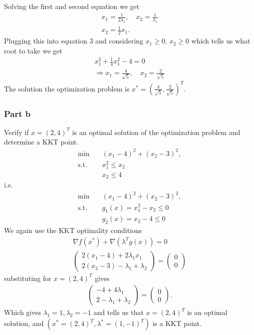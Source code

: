 Solving the first and second equation we get
\begin{align}
    x_1 = \frac{1}{2\lambda_1},\quad x_2 = \frac{1}{\lambda_1}\\
    x_2 = \frac{1}{2}x_1.
\end{align}
Plugging this into equation 3 and considering $x_1 \ge 0$, $x_2 \ge 0$
which tells us what root to take we get
\begin{align}
    x_1^{2}+\frac{1}{4}x_1^{2} -4 = 0\\
    \Rightarrow x_1 = \frac{4}{\sqrt{5}}, \quad x_2 = \frac{2}{\sqrt{5} }
\end{align}
The solution the optimization problem is $x^{*}=(\frac{4}{\sqrt{5}},
\frac{2}{\sqrt{5}})^{T}$.
\subsubsection{Part b}
Verify if $x=(2,4)^{T}$ is an optimal solution of the optimization problem
and determine a KKT point.
\begin{align}
    \text{min}\quad & (x_1-4)^{2} + (x_2-3)^{2},\\
    \text{s.t.}\quad & x_1^{2}\le x_2 \nonumber\\
    &x_2 \le 4 \nonumber
\end{align}
i.e.
\begin{align}
    \text{min}\quad & (x_1-4)^{2} + (x_2-3)^{2},\\
    \text{s.t.}\quad &g_1(x) = x_1^{2} - x_2\le 0  \nonumber\\
    &g_2(x) = x_2 -4 \le 0 \nonumber
\end{align}
We again use the KKT optimality conditions
\begin{align}
    \nabla f(x^{*})  + \nabla (\lambda^{T}g(x)) = 0\\
    \begin{pmatrix}
        2(x_1-4) + 2\lambda_1x_1\\
        2(x_2-3) - \lambda_1 + \lambda_2
    \end{pmatrix} =
    \begin{pmatrix} 0\\0 \end{pmatrix}
\end{align}
substituting for $x=(2,4)^{T}$ gives \begin{align} \begin{pmatrix}
        -4 + 4\lambda_1\\
        2 -\lambda_1 + \lambda_{2}
    \end{pmatrix}
    =
    \begin{pmatrix}
        0\\0
    \end{pmatrix}.
\end{align}
Which gives $\lambda_1 = 1, \lambda_2 = -1$ and tells us that $x=(2,4)^{T}$
is an optimal solution, and $\left( x^{*}=(2,4)^{T}, \lambda^{*}= (1,
-1)^{T}\right)$ is a KKT point.

